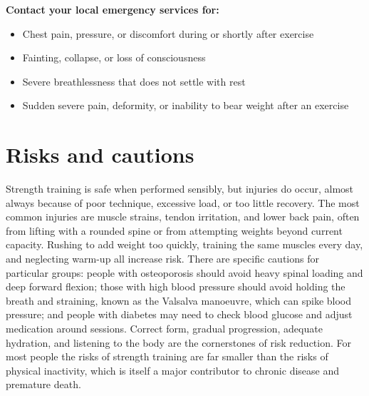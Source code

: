 \textbf{Contact your local emergency services for:}
\begin{itemize}
    \item Chest pain, pressure, or discomfort during or shortly after exercise
    \item Fainting, collapse, or loss of consciousness
    \item Severe breathlessness that does not settle with rest
    \item Sudden severe pain, deformity, or inability to bear weight after an exercise
\end{itemize}

\section*{Risks and cautions}
Strength training is safe when performed sensibly, but injuries do occur, almost always because of poor technique, excessive load, or too little recovery. The most common injuries are muscle strains, tendon irritation, and lower back pain, often from lifting with a rounded spine or from attempting weights beyond current capacity. Rushing to add weight too quickly, training the same muscles every day, and neglecting warm-up all increase risk. There are specific cautions for particular groups: people with osteoporosis should avoid heavy spinal loading and deep forward flexion; those with high blood pressure should avoid holding the breath and straining, known as the Valsalva manoeuvre, which can spike blood pressure; and people with diabetes may need to check blood glucose and adjust medication around sessions. Correct form, gradual progression, adequate hydration, and listening to the body are the cornerstones of risk reduction. For most people the risks of strength training are far smaller than the risks of physical inactivity, which is itself a major contributor to chronic disease and premature death.

